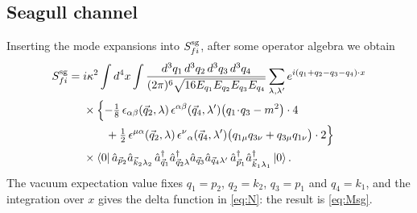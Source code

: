 \documentclass[12pt,a4paper,oneside]{article}
\numberwithin{equation}{section}   %
\begin{document}
\subsection{Seagull channel}
Inserting the mode expansions into $S^{\rm sg}_{fi}$, after some operator algebra we obtain
\begin{align}
S^{\rm sg}_{fi}=\;&i\kappa^{2}
\int d^{4}x
\int\frac{d^{3}q_1\,d^{3}q_2\,d^{3}q_3\,d^{3}q_4}
{(2\pi)^{6}\sqrt{16E_{q_1}E_{q_2}E_{q_3}E_{q_4}}}
\sum_{\lambda,\lambda'}
e^{i(q_1+q_2-q_3-q_4)\cdot x}\notag\\
&\times\Bigl\{
-\tfrac18\,\epsilon_{\alpha\beta}(\vec q_2,\lambda)\,\epsilon^{\alpha\beta}(\vec q_4,\lambda')
\bigl(q_1\!\cdot\!q_3-m^{2}\bigr)\cdot 4\notag\\
&\qquad
+\tfrac12\,\epsilon^{\mu\alpha}(\vec q_2,\lambda)\,\epsilon^{\nu}{}_{\alpha}(\vec q_4,\lambda')
\bigl(q_{1\mu}q_{3\nu}+q_{3\mu}q_{1\nu}\bigr)\cdot 2
\Bigr\}\notag\\
&\times
\bra{0}\hat a_{\vec p_2}\hat a_{\vec k_2\lambda_2}\,
\hat a^{\dagger}_{\vec q_1}\hat a^{\dagger}_{\vec q_2\lambda}\hat a_{\vec q_3}\hat a_{\vec q_4\lambda'}\,
\hat a^{\dagger}_{\vec p_1}\hat a^{\dagger}_{\vec k_1\lambda_1}\ket{0}.
\label{seagull}
\end{align}
The vacuum expectation value fixes $q_1=p_2$, $q_2=k_2$, $q_3=p_1$ and $q_4=k_1$, and the
integration over $x$ gives the delta function in \eqref{eq:N}: the result is \eqref{eq:Msg}.
\end{document}
